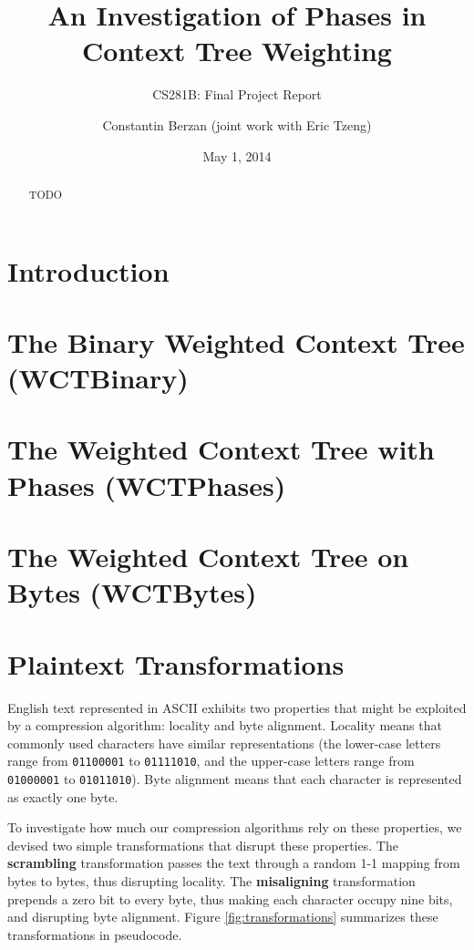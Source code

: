 \documentclass[11pt]{scrartcl}
\title{An Investigation of Phases in Context Tree Weighting}
\subtitle{CS281B: Final Project Report}
\author{Constantin Berzan (joint work with Eric Tzeng)}
\date{May 1, 2014}
\begin{document}
\maketitle

\begin{abstract}
TODO
\end{abstract}

\section{Introduction}


\section{The Binary Weighted Context Tree (WCTBinary)}


\section{The Weighted Context Tree with Phases (WCTPhases)}


\section{The Weighted Context Tree on Bytes (WCTBytes)}


\section{Plaintext Transformations}

English text represented in ASCII exhibits two properties that might be
exploited by a compression algorithm: locality and byte alignment. Locality
means that commonly used characters have similar representations (the
lower-case letters range from {\tt 01100001} to {\tt 01111010}, and the
upper-case letters range from {\tt 01000001} to {\tt 01011010}). Byte alignment
means that each character is represented as exactly one byte.

To investigate how much our compression algorithms rely on these properties, we
devised two simple transformations that disrupt these properties. The {\bf
scrambling} transformation passes the text through a random 1-1 mapping from
bytes to bytes, thus disrupting locality. The {\bf misaligning} transformation
prepends a zero bit to every byte, thus making each character occupy nine bits,
and disrupting byte alignment. Figure \ref{fig:transformations} summarizes
these transformations in pseudocode.
\end{document}

